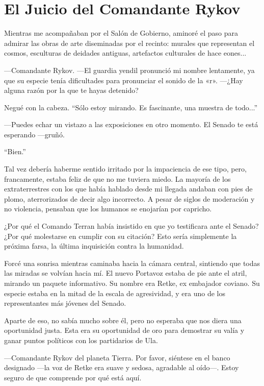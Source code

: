 \chapter{El Juicio del Comandante Rykov}\label{sec:el-juicio-del-comandante-rykov}

Mientras me acompañaban por el Salón de Gobierno, aminoré el paso para admirar las obras de arte diseminadas por el recinto: murales que representan el cosmos, esculturas de deidades antiguas, artefactos culturales de hace eones...

—Comandante Rykov. —El guardia yendil pronunció mi nombre lentamente, ya que su especie tenía dificultades para pronunciar el sonido de la «r». —¿Hay alguna razón por la que te hayas detenido?

Negué con la cabeza. ``Sólo estoy mirando. Es fascinante, una muestra de todo...''


—Puedes echar un vistazo a las exposiciones en otro momento. El Senado te está esperando —gruñó.

``Bien.''


Tal vez debería haberme sentido irritado por la impaciencia de ese tipo, pero, francamente, estaba feliz de que no me tuviera miedo. La mayoría de los extraterrestres con los que había hablado desde mi llegada andaban con pies de plomo, aterrorizados de decir algo incorrecto. A pesar de siglos de moderación y no violencia, pensaban que los humanos se enojarían por capricho.

¿Por qué el Comando Terran había insistido en que yo testificara ante el Senado? ¿Por qué molestarse en cumplir con su citación? Esto sería simplemente la próxima farsa, la última inquisición contra la humanidad.

Forcé una sonrisa mientras caminaba hacia la cámara central, sintiendo que todas las miradas se volvían hacia mí. El nuevo Portavoz estaba de pie ante el atril, mirando un paquete informativo. Su nombre era Retke, ex embajador coviano. Su especie estaba en la mitad de la escala de agresividad, y era uno de los representantes más jóvenes del Senado.

Aparte de eso, no sabía mucho sobre él, pero no esperaba que nos diera una oportunidad justa. Esta era su oportunidad de oro para demostrar su valía y ganar puntos políticos con los partidarios de Ula.

—Comandante Rykov del planeta Tierra. Por favor, siéntese en el banco designado —la voz de Retke era suave y sedosa, agradable al oído—. Estoy seguro de que comprende por qué está aquí.

